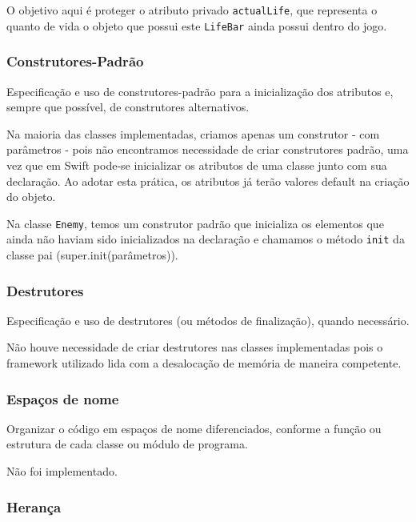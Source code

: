 \documentclass[rel_mlp]{iiufrgs}
\begin{document}
O objetivo aqui é proteger o atributo privado \texttt{actualLife}, que representa o quanto de vida o objeto que possui este \texttt{LifeBar} ainda possui dentro do jogo.


\subsubsection{Construtores-Padrão}

Especificação e uso de construtores-padrão para a inicialização dos atributos e, sempre que possível, de construtores alternativos.

Na maioria das classes implementadas, criamos apenas um construtor - com parâmetros - pois não encontramos necessidade de criar construtores padrão, uma vez que em Swift pode-se inicializar os atributos de uma classe junto com sua declaração. Ao adotar esta prática, os atributos já terão valores default na criação do objeto.

Na classe \texttt{Enemy}, temos um construtor padrão que inicializa os elementos que ainda não haviam sido inicializados na declaração e chamamos o método \texttt{init} da classe pai (super.init(parâmetros)).


\subsubsection{Destrutores}

Especificação e uso de destrutores (ou métodos de finalização), quando necessário.

Não houve necessidade de criar destrutores nas classes implementadas pois o framework utilizado lida com a desalocação de memória de maneira competente.


\subsubsection{Espaços de nome}

Organizar o código em espaços de nome diferenciados, conforme a função ou estrutura de cada classe ou módulo de programa.

Não foi implementado.


\subsubsection{Herança}
\end{document}
